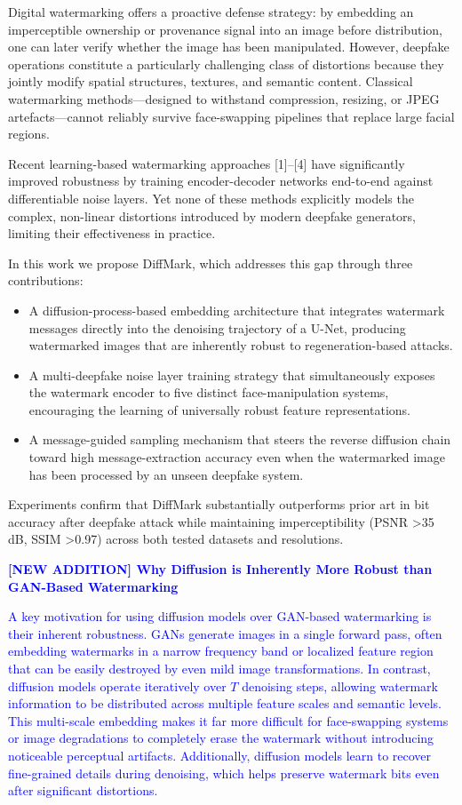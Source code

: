 \documentclass{article}
\begin{document}
Digital watermarking offers a proactive defense strategy: by embedding an imperceptible ownership or provenance signal into an image before distribution, one can later verify whether the image has been manipulated. However, deepfake operations constitute a particularly challenging class of distortions because they jointly modify spatial structures, textures, and semantic content. Classical watermarking methods—designed to withstand compression, resizing, or JPEG artefacts—cannot reliably survive face-swapping pipelines that replace large facial regions.

Recent learning-based watermarking approaches [1]–[4] have significantly improved robustness by training encoder-decoder networks end-to-end against differentiable noise layers. Yet none of these methods explicitly models the complex, non-linear distortions introduced by modern deepfake generators, limiting their effectiveness in practice.

In this work we propose DiffMark, which addresses this gap through three contributions:
\begin{itemize}
\item A diffusion-process-based embedding architecture that integrates watermark messages directly into the denoising trajectory of a U-Net, producing watermarked images that are inherently robust to regeneration-based attacks.
\item A multi-deepfake noise layer training strategy that simultaneously exposes the watermark encoder to five distinct face-manipulation systems, encouraging the learning of universally robust feature representations.
\item A message-guided sampling mechanism that steers the reverse diffusion chain toward high message-extraction accuracy even when the watermarked image has been processed by an unseen deepfake system.
\end{itemize}

Experiments confirm that DiffMark substantially outperforms prior art in bit accuracy after deepfake attack while maintaining imperceptibility (PSNR >35 dB, SSIM >0.97) across both tested datasets and resolutions.

\vspace{1em}
\textcolor{blue}{\textbf{[NEW ADDITION] Why Diffusion is Inherently More Robust than GAN-Based Watermarking}}

\textcolor{blue}{
A key motivation for using diffusion models over GAN-based watermarking is their inherent robustness. GANs generate images in a single forward pass, often embedding watermarks in a narrow frequency band or localized feature region that can be easily destroyed by even mild image transformations. In contrast, diffusion models operate iteratively over $T$ denoising steps, allowing watermark information to be distributed across multiple feature scales and semantic levels. This multi-scale embedding makes it far more difficult for face-swapping systems or image degradations to completely erase the watermark without introducing noticeable perceptual artifacts. Additionally, diffusion models learn to recover fine-grained details during denoising, which helps preserve watermark bits even after significant distortions.
}
\end{document}
